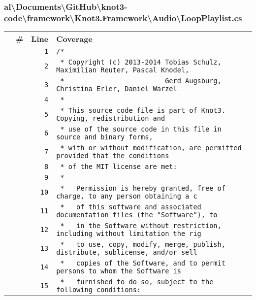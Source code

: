 \documentclass[a4paper,10pt]{article}
\begin{document}
\subsubsection{al\textbackslash Documents\textbackslash GitHub\textbackslash knot3-code\textbackslash framework\textbackslash Knot3.Framework\textbackslash Audio\textbackslash LoopPlaylist.cs}
\begin{longtable}[l]{lrrl}
\textbf{} & \textbf{\#} & \textbf{Line} & \textbf{Coverage}\\
\cellcolor{gray} &  & \verb~1~ & \verb~/*~\\
\cellcolor{gray} &  & \verb~2~ & \verb~ * Copyright (c) 2013-2014 Tobias Schulz, Maximilian Reuter, Pascal Knodel,~\\
\cellcolor{gray} &  & \verb~3~ & \verb~ *                         Gerd Augsburg, Christina Erler, Daniel Warzel~\\
\cellcolor{gray} &  & \verb~4~ & \verb~ *~\\
\cellcolor{gray} &  & \verb~5~ & \verb~ * This source code file is part of Knot3. Copying, redistribution and~\\
\cellcolor{gray} &  & \verb~6~ & \verb~ * use of the source code in this file in source and binary forms,~\\
\cellcolor{gray} &  & \verb~7~ & \verb~ * with or without modification, are permitted provided that the conditions~\\
\cellcolor{gray} &  & \verb~8~ & \verb~ * of the MIT license are met:~\\
\cellcolor{gray} &  & \verb~9~ & \verb~ *~\\
\cellcolor{gray} &  & \verb~10~ & \verb~ *   Permission is hereby granted, free of charge, to any person obtaining a c~\\
\cellcolor{gray} &  & \verb~11~ & \verb~ *   of this software and associated documentation files (the "Software"), to ~\\
\cellcolor{gray} &  & \verb~12~ & \verb~ *   in the Software without restriction, including without limitation the rig~\\
\cellcolor{gray} &  & \verb~13~ & \verb~ *   to use, copy, modify, merge, publish, distribute, sublicense, and/or sell~\\
\cellcolor{gray} &  & \verb~14~ & \verb~ *   copies of the Software, and to permit persons to whom the Software is~\\
\cellcolor{gray} &  & \verb~15~ & \verb~ *   furnished to do so, subject to the following conditions:~\\

\end{longtable}
\end{document}
